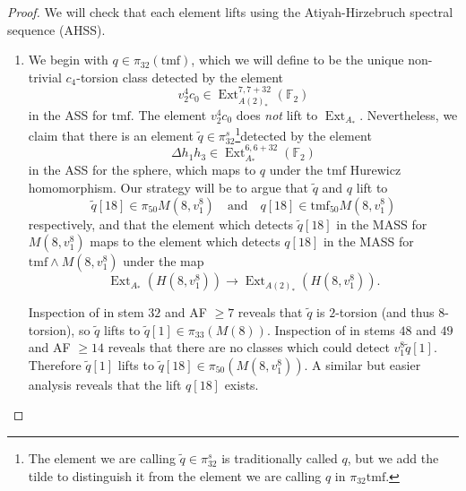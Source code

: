 \documentclass[10pt]{amsart}
\newcommand{\mr}[1]{\mathrm{#1}}
\newcommand{\td}[1]{\widetilde{#1}}
\newcommand{\FF}{\mathbb{F}}
\newcommand{\tmf}{\mathrm{tmf}}
\theoremstyle{definition}
\numberwithin{equation}{section}
\numberwithin{figure}{section}
\DeclareMathOperator{\Ext}{Ext}
\begin{document}
\begin{proof}
We will check that each element lifts using the Atiyah-Hirzebruch spectral sequence (AHSS).

\begin{enumerate}

\item We begin with $q \in \pi_{32}(\tmf)$, which we will define to be the unique non-trivial $c_4$-torsion class detected by the element 
$$ v_2^4 c_0 \in \Ext^{7,7+32}_{A(2)_*}(\FF_2) $$
in the ASS for $\tmf$. The element $v_2^4 c_0$ does \emph{not} lift to $\Ext_{A_*}$.  
Nevertheless, we claim that there is an element $\td{q} \in \pi^s_{32}$\footnote{The element we are calling $\td{q}\in \pi^s_{32}$ is traditionally called $q$, but we add the tilde to distinguish it from the element we are calling $q$ in $\pi_{32}\tmf$.}detected by the element
$$ \Delta h_1 h_3 \in \Ext^{6,6+32}_{A_*}(\FF_2) $$
in the ASS for the sphere, which maps to $q$ under the $\tmf$ Hurewicz homomorphism.  Our strategy will be to argue that $\td{q}$ and $q$ lift to 
$$ \td{q}[18] \in \pi_{50}M(8,v_1^8) \quad \mr{and} \quad q[18] \in \tmf_{50}M(8,v_1^8) $$ respectively, and that the element which detects $\td{q}[18]$ in the MASS for $M(8,v_1^8)$ maps to the element which detects $q[18]$ in the MASS for $\tmf \wedge M(8,v_1^8)$ under the map
\begin{equation}\label{eq:extmap}
 \Ext_{A_*}(H(8,v_1^8)) \rightarrow \Ext_{A(2)_*}(H(8,v_1^8)).
 \end{equation}

Inspection of \cite[Pg. 3]{IsaksenChart} in stem $32$ and AF $ \geq 7$ reveals that $\td{q}$ is $2$-torsion (and thus $8$-torsion), so $\td{q}$ lifts to $\td{q}[1] \in \pi_{33}(M(8))$. Inspection of \cite[Pg. 3]{IsaksenChart} in stems $48$ and $49$ and AF $\geq 14$ reveals that there are no classes which could detect $v_1^8 \td{q}[1]$. Therefore $\td{q}[1]$ lifts to $\td{q}[18] \in \pi_{50}(M(8,v_1^8))$.  A similar but easier analysis reveals that the lift $q[18]$ exists.


\end{enumerate}
\end{proof}
\end{document}
